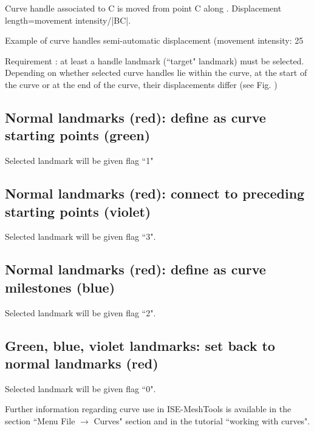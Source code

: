 Curve handle associated to C is moved
from point C along . Displacement
length=movement intensity/|BC|.


Example of curve handles semi-automatic displacement (movement intensity: 25%

Requirement : at least a handle landmark (``target" landmark) must be selected.
Depending on whether selected curve handles lie within the curve, at the start of the curve or at the
end of the curve, their displacements differ (see Fig. )



\subsection{Normal landmarks (red): define as curve starting points (green)}
Selected landmark will be given flag ``1"


\subsection{Normal landmarks (red): connect to preceding starting points (violet)}
Selected landmark will be given flag ``3".


\subsection{Normal landmarks (red): define as curve milestones (blue)}
Selected landmark will be given flag ``2".

\subsection{Green, blue, violet landmarks: set back to normal landmarks (red)}
Selected landmark will be given flag ``0".


Further information regarding curve use in ISE-MeshTools is available in the section ``Menu File $\rightarrow$
Curves" section and in the tutorial ``working with curves".